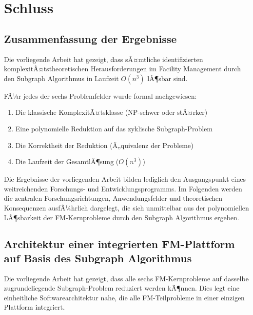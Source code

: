 ﻿\documentclass[a4paper,12pt]{article}
\theoremstyle{definition}
\begin{document}
\section{Schluss}
\label{sec:schluss}

\subsection{Zusammenfassung der Ergebnisse}

Die vorliegende Arbeit hat gezeigt, dass sÃ¤mtliche identifizierten
komplexitÃ¤tstheoretischen Herausforderungen im Facility Management durch
den Subgraph Algorithmus in Laufzeit $O(n^3)$ lÃ¶sbar sind.

FÃ¼r jedes der sechs Problemfelder wurde formal nachgewiesen:
\begin{enumerate}
    \item Die klassische KomplexitÃ¤tsklasse (NP-schwer oder stÃ¤rker)
    \item Eine polynomielle Reduktion auf das zyklische Subgraph-Problem
    \item Die Korrektheit der Reduktion (Ã„quivalenz der Probleme)
    \item Die Laufzeit der GesamtlÃ¶sung ($O(n^3)$)
\end{enumerate}

Die Ergebnisse der vorliegenden Arbeit bilden lediglich den Ausgangspunkt eines
weitreichenden Forschungs- und Entwicklungsprogramms. Im Folgenden werden die
zentralen Forschungsrichtungen, Anwendungsfelder und theoretischen Konsequenzen
ausfÃ¼hrlich dargelegt, die sich unmittelbar aus der polynomiellen LÃ¶sbarkeit der
FM-Kernprobleme durch den Subgraph Algorithmus ergeben.

\subsection{Architektur einer integrierten FM-Plattform auf Basis des Subgraph Algorithmus}

Die vorliegende Arbeit hat gezeigt, dass alle sechs FM-Kernprobleme auf dasselbe
zugrundeliegende Subgraph-Problem reduziert werden kÃ¶nnen. Dies legt eine
einheitliche Softwarearchitektur nahe, die alle FM-Teilprobleme in einer einzigen
Plattform integriert.
\end{document}
